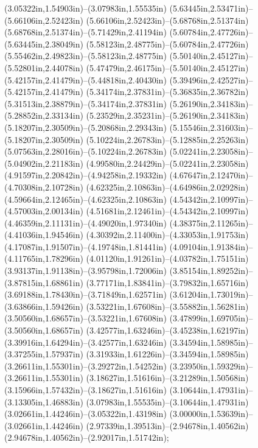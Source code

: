 (3.05322in,1.54903in)--(3.07983in,1.55535in) (5.63445in,2.53471in)--(5.66106in,2.52423in) (5.66106in,2.52423in)--(5.68768in,2.51374in) (5.68768in,2.51374in)--(5.71429in,2.41194in) (5.60784in,2.47726in)--(5.63445in,2.38049in) (5.58123in,2.48775in)--(5.60784in,2.47726in) (5.55462in,2.49823in)--(5.58123in,2.48775in) (5.50140in,2.45127in)--(5.52801in,2.44078in) (5.47479in,2.46175in)--(5.50140in,2.45127in) (5.42157in,2.41479in)--(5.44818in,2.40430in) (5.39496in,2.42527in)--(5.42157in,2.41479in) (5.34174in,2.37831in)--(5.36835in,2.36782in) (5.31513in,2.38879in)--(5.34174in,2.37831in) (5.26190in,2.34183in)--(5.28852in,2.33134in) (5.23529in,2.35231in)--(5.26190in,2.34183in) (5.18207in,2.30509in)--(5.20868in,2.29343in) (5.15546in,2.31603in)--(5.18207in,2.30509in) (5.10224in,2.26783in)--(5.12885in,2.25263in) (5.07563in,2.28016in)--(5.10224in,2.26783in) (5.02241in,2.23058in)--(5.04902in,2.21183in) (4.99580in,2.24429in)--(5.02241in,2.23058in) (4.91597in,2.20842in)--(4.94258in,2.19332in) (4.67647in,2.12470in)--(4.70308in,2.10728in) (4.62325in,2.10863in)--(4.64986in,2.02928in) (4.59664in,2.12465in)--(4.62325in,2.10863in) (4.54342in,2.10997in)--(4.57003in,2.00134in) (4.51681in,2.12461in)--(4.54342in,2.10997in) (4.46359in,2.11131in)--(4.49020in,1.97340in) (4.38375in,2.11265in)--(4.41036in,1.94546in) (4.30392in,2.11400in)--(4.33053in,1.91753in) (4.17087in,1.91507in)--(4.19748in,1.81441in) (4.09104in,1.91384in)--(4.11765in,1.78296in) (4.01120in,1.91261in)--(4.03782in,1.75151in) (3.93137in,1.91138in)--(3.95798in,1.72006in) (3.85154in,1.89252in)--(3.87815in,1.68861in) (3.77171in,1.83841in)--(3.79832in,1.65716in) (3.69188in,1.78430in)--(3.71849in,1.62571in) (3.61204in,1.73019in)--(3.63866in,1.59426in) (3.53221in,1.67608in)--(3.55882in,1.56281in) (3.50560in,1.68657in)--(3.53221in,1.67608in) (3.47899in,1.69705in)--(3.50560in,1.68657in) (3.42577in,1.63246in)--(3.45238in,1.62197in) (3.39916in,1.64294in)--(3.42577in,1.63246in) (3.34594in,1.58985in)--(3.37255in,1.57937in) (3.31933in,1.61226in)--(3.34594in,1.58985in) (3.26611in,1.55301in)--(3.29272in,1.54252in) (3.23950in,1.59329in)--(3.26611in,1.55301in) (3.18627in,1.51616in)--(3.21289in,1.50568in) (3.15966in,1.57432in)--(3.18627in,1.51616in) (3.10644in,1.47931in)--(3.13305in,1.46883in) (3.07983in,1.55535in)--(3.10644in,1.47931in) (3.02661in,1.44246in)--(3.05322in,1.43198in) (3.00000in,1.53639in)--(3.02661in,1.44246in) (2.97339in,1.39513in)--(2.94678in,1.40562in) (2.94678in,1.40562in)--(2.92017in,1.51742in);
